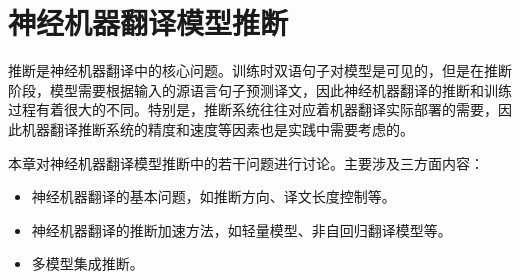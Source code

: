 
%


\renewcommand\figurename{图}%
\renewcommand\tablename{表}%


\chapter{神经机器翻译模型推断}

\parinterval 推断是神经机器翻译中的核心问题。训练时双语句子对模型是可见的，但是在推断阶段，模型需要根据输入的源语言句子预测译文，因此神经机器翻译的推断和训练过程有着很大的不同。特别是，推断系统往往对应着机器翻译实际部署的需要，因此机器翻译推断系统的精度和速度等因素也是实践中需要考虑的。

\parinterval 本章对神经机器翻译模型推断中的若干问题进行讨论。主要涉及三方面内容：

\begin{itemize}
\vspace{0.5em}
\item 神经机器翻译的基本问题，如推断方向、译文长度控制等。
\vspace{0.5em}
\item 神经机器翻译的推断加速方法，如轻量模型、非自回归翻译模型等。
\vspace{0.5em}
\item 多模型集成推断。
\vspace{0.5em}
\end{itemize}
